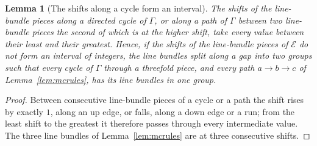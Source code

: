 \documentclass[11pt,reqno]{amsart}
\numberwithin{equation}{section}
\theoremstyle{plain}
\newtheorem{lemma}[theorem]{Lemma}
\theoremstyle{definition}
\begin{document}
\begin{lemma}[The shifts along a cycle form an interval]\label{lem:interval}
The shifts of the line-bundle pieces along a directed cycle of $\Gamma$, or along a path of $\Gamma$ between two line-bundle pieces the second of which is at the higher shift, take every value between their least and their greatest. Hence, if the shifts of the line-bundle pieces of $\mathcal{E}$ do not form an interval of integers, the line bundles split along a gap into two groups such that every cycle of $\Gamma$ through a threefold piece, and every path $a\to b\to c$ of Lemma~\ref{lem:mcrules}, has its line bundles in one group.
\end{lemma}

\begin{proof}
Between consecutive line-bundle pieces of a cycle or a path the shift rises by exactly $1$, along an up edge, or falls, along a down edge or a run; from the least shift to the greatest it therefore passes through every intermediate value. The three line bundles of Lemma~\ref{lem:mcrules} are at three consecutive shifts.
\end{proof}
\end{document}
